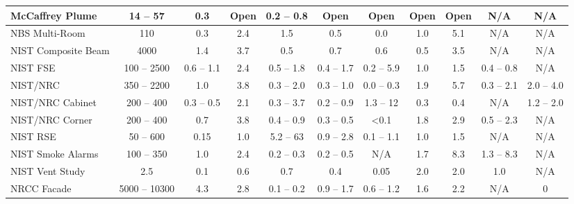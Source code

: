 \begin{landscape}
\begin{longtable}{|l|c|c|c|c|c|c|c|c|c|c|}
McCaffrey Plume     & 14 -- 57      & 0.3           & Open  & 0.2 -- 0.8        & Open                & Open          & Open        & Open        & N/A                   & N/A                   \\ \hline
NBS Multi-Room      & 110           & 0.3           & 2.4   & 1.5               & 0.5                 & 0.0           & 1.0         & 5.1         & N/A                   & N/A                   \\ \hline
NIST Composite Beam & 4000          & 1.4           & 3.7   & 0.5               & 0.7                 & 0.6           & 0.5         & 3.5         & N/A                   & N/A                   \\ \hline
NIST FSE            & 100 -- 2500   & 0.6 -- 1.1    & 2.4   & 0.5 -- 1.8        & 0.4 -- 1.7          & 0.2 -- 5.9    & 1.0         & 1.5         & 0.4 -- 0.8            & N/A                   \\ \hline
NIST/NRC            & 350 -- 2200   & 1.0           & 3.8   & 0.3 -- 2.0        & 0.3 -- 1.0          & 0.0 -- 0.3    & 1.9         & 5.7         & 0.3 -- 2.1            & 2.0 -- 4.0            \\ \hline
NIST/NRC Cabinet    & 200 -- 400    & 0.3 -- 0.5    & 2.1   & 0.3 -- 3.7        & 0.2 -- 0.9          & 1.3 -- 12     & 0.3         & 0.4         & N/A                   & 1.2 -- 2.0            \\ \hline
NIST/NRC Corner     & 200 -- 400    & 0.7           & 3.8   & 0.4 -- 0.9        & 0.3 -- 0.5          & <0.1          & 1.8         & 2.9         & 0.5 -- 2.3            & N/A                   \\ \hline
NIST RSE            & 50 -- 600     & 0.15          & 1.0   & 5.2 -- 63         & 0.9 -- 2.8          & 0.1 -- 1.1    & 1.0         & 1.5         & N/A                   & N/A                   \\ \hline
NIST Smoke Alarms   & 100 -- 350    & 1.0           & 2.4   & 0.2 -- 0.3        & 0.2 -- 0.5          & N/A           & 1.7         & 8.3         & 1.3 -- 8.3            & N/A                   \\ \hline
NIST Vent Study     & 2.5           & 0.1           & 0.6   & 0.7               & 0.4                 & 0.05          & 2.0         & 2.0         & 1.0                   & N/A                   \\ \hline
NRCC Facade         & 5000 -- 10300 & 4.3           & 2.8   & 0.1 -- 0.2        & 0.9 -- 1.7          & 0.6 -- 1.2    & 1.6         & 2.2         & N/A                   & 0                     \\ \hline

\end{longtable}
\end{landscape}
